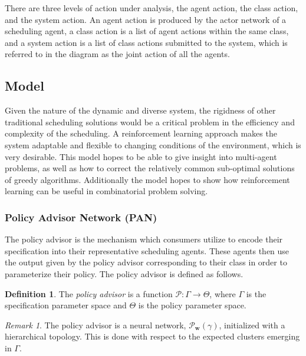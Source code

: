 \documentclass{article}
\theoremstyle{definition}
\newtheorem{definition}{Definition}[section]
\theoremstyle{remark}
\newtheorem*{remark}{Remark}
\begin{document}
		There are three levels of action under analysis, the agent action, the class action, and the system action. An agent action is produced by the actor network of a scheduling agent, a class action is a list of agent actions within the same class, and a system action is a list of class actions submitted to the system, which is referred to in the diagram as the joint action of all the agents.

		\subsection{Model}

		Given the nature of the dynamic and diverse system, the rigidness of other traditional scheduling solutions would be a critical problem in the efficiency and complexity of the scheduling. A reinforcement learning approach makes the system adaptable and flexible to changing conditions of the environment, which is very desirable. This model hopes to be able to give insight into multi-agent problems, as well as how to correct the relatively common sub-optimal solutions of greedy algorithms. Additionally the model hopes to show how reinforcement learning can be useful in combinatorial problem solving.

			\subsubsection{Policy Advisor Network (PAN)}

			The policy advisor is the mechanism which consumers utilize to encode their specification into their representative scheduling agents. These agents then use the output given by the policy advisor corresponding to their class in order to parameterize their policy. The policy advisor is defined as follows.

			\begin{definition}
				The \emph{policy advisor} is a function $\mathcal{P}: \Gamma \rightarrow \Theta$, where $\Gamma$ is the specification parameter space and $\Theta$ is the policy parameter space.
			\end{definition}

			\begin{remark}
				The policy advisor is a neural network, $\mathcal{P}_{\mathbf{w}}(\gamma)$, initialized with a hierarchical topology. This is done with respect to the expected clusters emerging in $\Gamma$.
			\end{remark}
\end{document}

